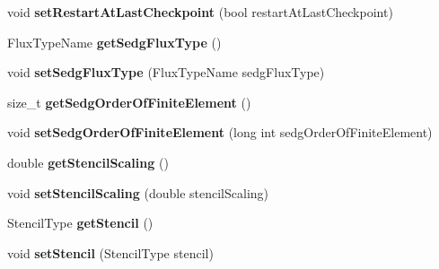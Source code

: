 \begin{DoxyCompactItemize}
\item 
\hypertarget{classnatrium_1_1SolverConfiguration_af6077ef11412e53eb16c013b4362410e}{void {\bfseries set\-Restart\-At\-Last\-Checkpoint} (bool restart\-At\-Last\-Checkpoint)}\label{classnatrium_1_1SolverConfiguration_af6077ef11412e53eb16c013b4362410e}

\item 
\hypertarget{classnatrium_1_1SolverConfiguration_aecc2a87bc6e50d6e09ea035678478c4f}{Flux\-Type\-Name {\bfseries get\-Sedg\-Flux\-Type} ()}\label{classnatrium_1_1SolverConfiguration_aecc2a87bc6e50d6e09ea035678478c4f}

\item 
\hypertarget{classnatrium_1_1SolverConfiguration_a331256f91794e32be618b1162c321bdd}{void {\bfseries set\-Sedg\-Flux\-Type} (Flux\-Type\-Name sedg\-Flux\-Type)}\label{classnatrium_1_1SolverConfiguration_a331256f91794e32be618b1162c321bdd}

\item 
\hypertarget{classnatrium_1_1SolverConfiguration_a1fad5bbbc062b1aad018da73e90033b2}{size\-\_\-t {\bfseries get\-Sedg\-Order\-Of\-Finite\-Element} ()}\label{classnatrium_1_1SolverConfiguration_a1fad5bbbc062b1aad018da73e90033b2}

\item 
\hypertarget{classnatrium_1_1SolverConfiguration_a2a9ab8b6b6dcb47ad4bb85ef06e15dea}{void {\bfseries set\-Sedg\-Order\-Of\-Finite\-Element} (long int sedg\-Order\-Of\-Finite\-Element)}\label{classnatrium_1_1SolverConfiguration_a2a9ab8b6b6dcb47ad4bb85ef06e15dea}

\item 
\hypertarget{classnatrium_1_1SolverConfiguration_adb7b45c43f97f0ce2ca288f92a32b577}{double {\bfseries get\-Stencil\-Scaling} ()}\label{classnatrium_1_1SolverConfiguration_adb7b45c43f97f0ce2ca288f92a32b577}

\item 
\hypertarget{classnatrium_1_1SolverConfiguration_a1dff19c0a3cc7386bd629dd72e59ac42}{void {\bfseries set\-Stencil\-Scaling} (double stencil\-Scaling)}\label{classnatrium_1_1SolverConfiguration_a1dff19c0a3cc7386bd629dd72e59ac42}

\item 
\hypertarget{classnatrium_1_1SolverConfiguration_a962af94c9599c393d8a16d7f5ae04d6c}{Stencil\-Type {\bfseries get\-Stencil} ()}\label{classnatrium_1_1SolverConfiguration_a962af94c9599c393d8a16d7f5ae04d6c}

\item 
\hypertarget{classnatrium_1_1SolverConfiguration_afa50192447fb027d0250a29b1ea86d1a}{void {\bfseries set\-Stencil} (Stencil\-Type stencil)}\label{classnatrium_1_1SolverConfiguration_afa50192447fb027d0250a29b1ea86d1a}


\end{DoxyCompactItemize}
